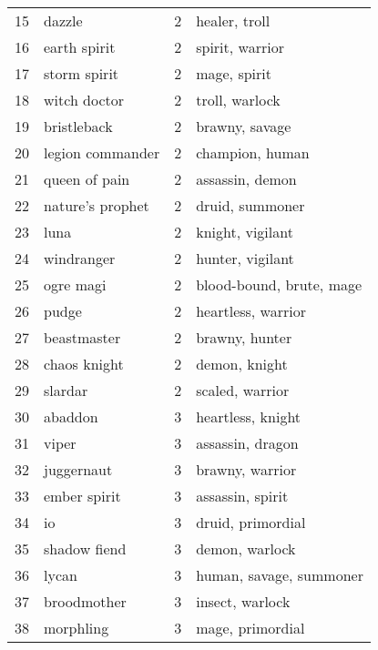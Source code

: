 \documentclass{article}
\begin{document}
\begin{table}
{\begin{tabular}{llrl}
15 &               dazzle &      2 &                  healer, troll \\
16 &         earth spirit &      2 &               spirit, warrior  \\
17 &         storm spirit &      2 &                   mage, spirit \\
18 &         witch doctor &      2 &                troll, warlock  \\
19 &          bristleback &      2 &                 brawny, savage \\
20 &     legion commander &      2 &                champion, human \\
21 &        queen of pain &      2 &                assassin, demon \\
22 &     nature's prophet &      2 &                druid, summoner \\
23 &                 luna &      2 &               knight, vigilant \\
24 &           windranger &      2 &               hunter, vigilant \\
25 &            ogre magi &      2 &       blood-bound, brute, mage \\
26 &                pudge &      2 &            heartless, warrior  \\
27 &          beastmaster &      2 &                 brawny, hunter \\
28 &         chaos knight &      2 &                  demon, knight \\
29 &              slardar &      2 &               scaled, warrior  \\
30 &              abaddon &      3 &              heartless, knight \\
31 &                viper &      3 &               assassin, dragon \\
32 &           juggernaut &      3 &               brawny, warrior  \\
33 &         ember spirit &      3 &               assassin, spirit \\
34 &                   io &      3 &              druid, primordial \\
35 &         shadow fiend &      3 &                demon, warlock  \\
36 &                lycan &      3 &        human, savage, summoner \\
37 &          broodmother &      3 &               insect, warlock  \\
38 &            morphling &      3 &               mage, primordial \\

\end{tabular}}
\end{table}
\end{document}
